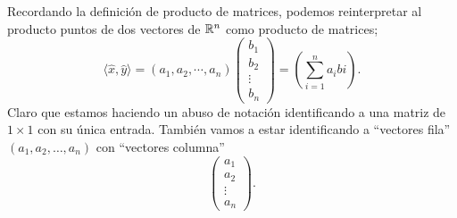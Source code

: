 Recordando la definición de producto de matrices, podemos
reinterpretar al producto puntos de dos vectores de $\mathbb{R}^{n}$
como producto de matrices;
\[
\langle \hat{x}, \hat{y} \rangle =
(a_{1}, a_{2}, \cdots , a_{n}) 
\begin{pmatrix}
b_{1} \\ b_{2} \\ \vdots \\ b_{n}
\end{pmatrix} 
= \left( \sum_{i=1}^{n}a_{i}b{i} \right).
\]
Claro que estamos haciendo un abuso de notación identificando
a una matriz de $1 \times 1$ con su única entrada.
También vamos a estar identificando a ``vectores fila''
$(a_{1}, a_{2}, \ldots , a_{n})$ con 
``vectores columna'' 
\[
\begin{pmatrix}
a_{1} \\ a_{2} \\ \vdots \\ a_{n}
\end{pmatrix}.
\]

